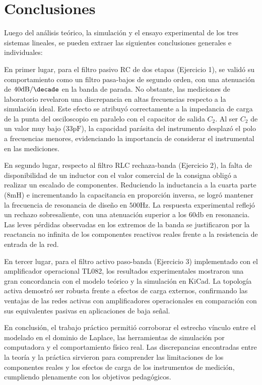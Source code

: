 \chapter{Conclusiones}

Luego del análisis teórico, la simulación y el ensayo experimental de los tres sistemas lineales, se pueden extraer
las siguientes conclusiones generales e individuales:

En primer lugar, para el filtro pasivo RC de dos etapas (Ejercicio 1), se validó su comportamiento como un filtro
pasa-bajos de segundo orden, con una atenuación de $40 \si{\decibel\per\decade}$ en la banda de parada. No obstante,
las mediciones de laboratorio revelaron una discrepancia en altas frecuencias respecto a la simulación ideal. Este
efecto se atribuyó correctamente a la impedancia de carga de la punta del osciloscopio en paralelo con el capacitor
de salida $C_2$. Al ser $C_2$ de un valor muy bajo ($33 \si{\pico\farad}$), la capacidad parásita del instrumento
desplazó el polo a frecuencias menores, evidenciando la importancia de considerar el instrumental en las mediciones.

En segundo lugar, respecto al filtro RLC rechaza-banda (Ejercicio 2), la falta de disponibilidad de un inductor
con el valor comercial de la consigna obligó a realizar un escalado de componentes. Reduciendo la inductancia a la
cuarta parte ($8 \si{\milli\henry}$) e incrementando la capacitancia en proporción inversa, se logró mantener la
frecuencia de resonancia de diseño en $500 \si{\hertz}$. La respuesta experimental reflejó un rechazo sobresaliente,
con una atenuación superior a los $60 \si{\decibel}$ en resonancia. Las leves pérdidas observadas en los extremos de
la banda se justificaron por la reactancia no infinita de los componentes reactivos reales frente a la resistencia
de entrada de la red.

En tercer lugar, para el filtro activo paso-banda (Ejercicio 3) implementado con el amplificador operacional
TL082, los resultados experimentales mostraron una gran concordancia con el modelo teórico y la simulación en KiCad.
La topología activa demostró ser robusta frente a efectos de carga externos, confirmando las ventajas de las redes
activas con amplificadores operacionales en comparación con sus equivalentes pasivas en aplicaciones de baja señal.

En conclusión, el trabajo práctico permitió corroborar el estrecho vínculo entre el modelado en el dominio de
Laplace, las herramientas de simulación por computadora y el comportamiento físico real. Las discrepancias
encontradas entre la teoría y la práctica sirvieron para comprender las limitaciones de los componentes reales y
los efectos de carga de los instrumentos de medición, cumpliendo plenamente con los objetivos pedagógicos.
